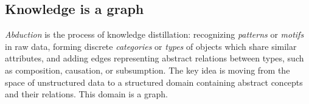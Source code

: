 \documentclass[11pt]{article}
\begin{document}
%



    \pagebreak\subsection{Knowledge is a graph}\label{subsec:kgs}

    \textit{Abduction} is the process of knowledge distillation: recognizing \textit{patterns} or \textit{motifs} in raw data, forming discrete \textit{categories} or \textit{types} of objects which share similar attributes, and adding edges representing abstract relations between types, such as composition, causation, or subsumption. The key idea is moving from the space of unstructured data to a structured domain containing abstract concepts and their relations. This domain is a graph.
\end{document}

